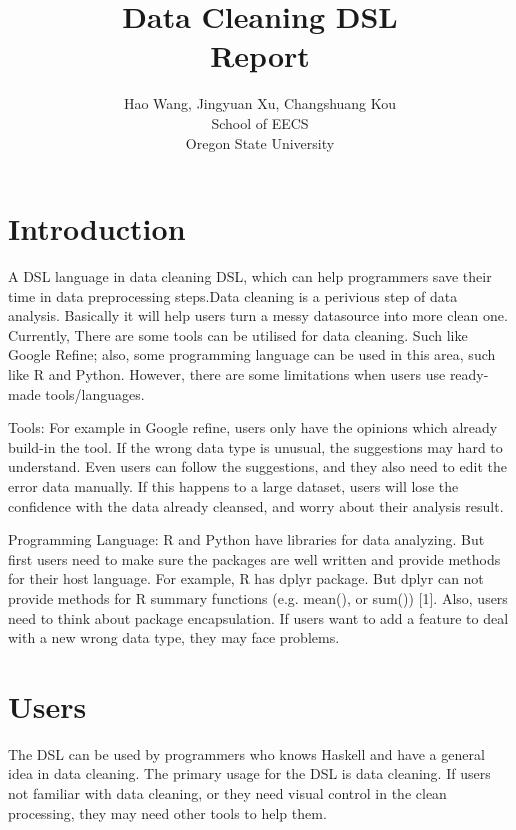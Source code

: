 \documentclass[11pt]{article}
\begin{document}
\title{\textbf{Data Cleaning DSL }
\\ Report}

\author{Hao Wang, Jingyuan Xu, Changshuang Kou \\
School of EECS \\ 
Oregon State University
}

\maketitle


\section{Introduction}
\label{sec:intro}
%
A DSL language in data cleaning DSL, which can help programmers save their time in data preprocessing steps.Data cleaning is a perivious step of data analysis. Basically it will help users turn a messy datasource into more clean one. Currently, There are some tools can be utilised for data cleaning. Such like Google Refine; also, some programming language can be used in this area, such like R and Python. However, there are some limitations when users use ready- made tools/languages. 

Tools: For example in Google refine, users only have the opinions which already build-in the tool. If the wrong data type is unusual, the suggestions may hard to understand. Even users can follow the suggestions, and they also need to edit the error data manually. If this happens to a large dataset, users will lose the confidence with the data already cleansed, and worry about their analysis result. 

Programming Language: R and Python have libraries for data analyzing. But first users need to make sure the packages are well written and provide methods for their host language. For example,  R has dplyr package. But dplyr can not provide methods for R summary functions (e.g. mean(), or sum()) [1]. Also, users need to think about package encapsulation. If users want to add a  feature to deal with a new wrong data type,  they may face problems. \\

\section{Users}
\label{sec:users}

The DSL can be used by programmers who knows Haskell and have a general idea in data cleaning. The primary usage for the DSL is data cleaning. If users not familiar with data cleaning, or they need visual control in the clean processing, they may need other tools to help them.\\
\end{document}
